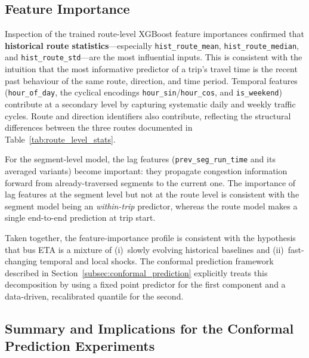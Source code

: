 \subsection{Feature Importance}
\label{subsec:feature_importance_results}

Inspection of the trained route-level XGBoost feature importances confirmed that \textbf{historical route statistics}---especially \texttt{hist\_route\_mean}, \texttt{hist\_route\_median}, and \texttt{hist\_route\_std}---are the most influential inputs. This is consistent with the intuition that the most informative predictor of a trip's travel time is the recent past behaviour of the same route, direction, and time period. Temporal features (\texttt{hour\_of\_day}, the cyclical encodings \texttt{hour\_sin}/\texttt{hour\_cos}, and \texttt{is\_weekend}) contribute at a secondary level by capturing systematic daily and weekly traffic cycles. Route and direction identifiers also contribute, reflecting the structural differences between the three routes documented in Table~\ref{tab:route_level_stats}.

For the segment-level model, the lag features (\texttt{prev\_seg\_run\_time} and its averaged variants) become important: they propagate congestion information forward from already-traversed segments to the current one. The importance of lag features at the segment level but not at the route level is consistent with the segment model being an \emph{within-trip} predictor, whereas the route model makes a single end-to-end prediction at trip start.

Taken together, the feature-importance profile is consistent with the hypothesis that bus ETA is a mixture of (i)~slowly evolving historical baselines and (ii)~fast-changing temporal and local shocks. The conformal prediction framework described in Section~\ref{subsec:conformal_prediction} explicitly treats this decomposition by using a fixed point predictor for the first component and a data-driven, recalibrated quantile for the second.

\subsection{Summary and Implications for the Conformal Prediction Experiments}
\label{subsec:baseline_summary_results}

